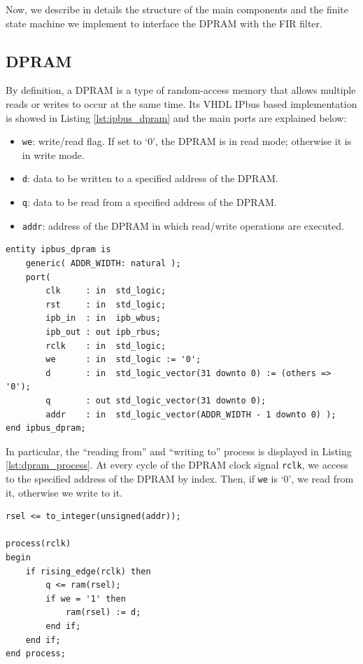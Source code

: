 \documentclass[11pt, a4paper]{article}
\begin{document}
Now, we describe in details the structure of the main components and the finite state machine we implement to interface the DPRAM with the FIR filter.

\subsection{DPRAM}
By definition, a DPRAM is a type of random-access memory that allows multiple reads or writes to occur at the same time. Its VHDL IPbus based implementation is showed in Listing \ref{lst:ipbus_dpram} and the main ports are explained below:
\begin{itemize}
    \item {\footnotesize\texttt{we}}: write/read flag. If set to `0', the DPRAM is in read mode; otherwise it is in write mode.
    \item {\footnotesize\texttt{d}}: data to be written to a specified address of the DPRAM.
    \item {\footnotesize\texttt{q}}: data to be read from a specified address of the DPRAM.
    \item {\footnotesize\texttt{addr}}: address of the DPRAM in which read/write operations are executed.
\end{itemize}

\begin{lstlisting}[style=vhdl,label={lst:ipbus_dpram},caption={{\footnotesize\texttt{ipbus\_dpram}} entity.}]
entity ipbus_dpram is
	generic( ADDR_WIDTH: natural );
	port(
		clk     : in  std_logic;
		rst     : in  std_logic;
		ipb_in  : in  ipb_wbus;
		ipb_out : out ipb_rbus;
		rclk    : in  std_logic;
		we      : in  std_logic := '0';
		d       : in  std_logic_vector(31 downto 0) := (others => '0');
		q       : out std_logic_vector(31 downto 0);
		addr    : in  std_logic_vector(ADDR_WIDTH - 1 downto 0) );
end ipbus_dpram;
\end{lstlisting}

In particular, the ``reading from'' and ``writing to'' process is displayed in Listing \ref{lst:dpram_process}. At every cycle of the DPRAM clock signal {\footnotesize\texttt{rclk}}, we access to the specified address of the DPRAM by index. Then, if {\footnotesize\texttt{we}} is `0', we read from it, otherwise we write to it.

\begin{lstlisting}[style=vhdl,label={lst:dpram_process},caption={Read from/Write to DPRAM process.}]
rsel <= to_integer(unsigned(addr));

process(rclk)
begin
	if rising_edge(rclk) then
		q <= ram(rsel); 
		if we = '1' then
			ram(rsel) := d;
		end if;
	end if;
end process;
\end{lstlisting}
\end{document}
